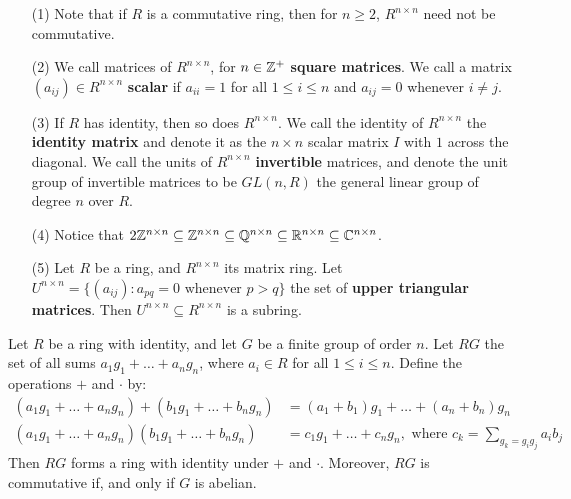 \begin{example}\label{example_5.7}
    \begin{enumerate}
        \item[(1)] Note that if $R$ is a commutative ring, then for $n \geq 2$,
            $R^{n \times n}$ need not be commutative.

        \item[(2)] We call matrices of $R^{n \times n}$, for $n \in \mathbb{Z}^+$
            \textbf{square matrices}. We call a matrix $(a_{ij}) \in R^{n \times
            n}$ \textbf{scalar} if $a_{ii}=1$ for all $1 \leq i \leq n$ and
            $a_{ij}=0$ whenever $i \neq j$.

        \item[(3)] If $R$ has identity, then so does  $R^{n \times n}$. We call
            the identity of $R^{n \times n}$ the \textbf{identity matrix} and
            denote it as the $n \times n$ scalar matrix  $I$ with $1$ across the
            diagonal. We call the units of $R^{n \times n}$ \textbf{invertible}
            matrices, and denote the unit group of invertible matrices to be
            $GL(n,R)$ the general linear group of degree $n$ over $R$.

        \item[(4)] Notice that $2\mathbb{Z}^{n \times n} \subseteq \mathbb{Z}^{n \times n}
            \subseteq \mathbb{Q}^{n \times n} \subseteq \mathbb{R}^{n \times n} \subseteq \mathbb{C}^{n
            \times n}$.

        \item[(5)] Let $R$ be a ring, and  $R^{n \times n}$ its matrix ring.
            Let $U^{n \times n}=\{(a_{ij}) : a_{pq}=0 \text{ whenever } p>q\}$
            the set of \textbf{upper triangular matrices}. Then $U^{n \times n}
            \subseteq R^{n \times n}$ is a subring.
    \end{enumerate}
\end{example}

\begin{theorem}\label{theorem_5.2.4}
    Let $R$ be a ring with identity, and let $G$ be a finite group of order $n$.
    Let $RG$ the set of all sums $a_1g_1+\dots+a_ng_n$, where $a_i \in R$ for
    all  $1 \leq i \leq n$. Define the operations $+$ and $\cdot$ by:
    \begin{align*}
        (a_1g_1+\dots+a_ng_n)+(b_1g_1+\dots+b_ng_n) &= (a_1+b_1)g_1+\dots+(a_n+b_n)g_n \\
        (a_1g_1+\dots+a_ng_n)(b_1g_1+\dots+b_ng_n)  &=  c_1g_1+\dots+c_ng_n,
        \text{ where } c_k=\sum_{g_k=g_ig_j}{a_ib_j}
    \end{align*}
    Then $RG$ forms a ring with identity under  $+$ and  $\cdot$. Moreover, $RG$
    is commutative if, and only if $G$ is abelian.
\end{theorem}

